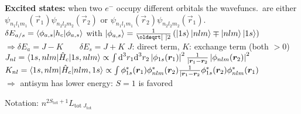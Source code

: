 \begin{squishlist}
    \item \textbf{Excited states:} when two $e^-$ occupy different orbitals the wavefuncs.\ are either
    $\psi_{n_1l_1m_1}(\vec{r}_1) \psi_{n_2l_2m_2}(\vec{r}_2)$ or $\psi_{n_1l_1m_1}(\vec{r}_2) \psi_{n_2l_2m_2}(\vec{r}_1)$. \\
    $\delta E_{a/s} = \braket{\phi_{a,s}|h_c|\phi_{a,s}}$ with
    $\ket{\phi_{a,s}} = \frac{1}{\sqrt{2}} \left( \ket{1s}\ket{nlm} \mp \ket{n l m}\ket{1s}\right)$ \\
    $\Rightarrow \delta E_a = J - K \qquad \delta E_s = J + K$ \qquad $J$: direct term, $K$: exchange term (both $> 0$) \\
    $J_{nl} = \braket{1s,nlm|\hat{H}_c|1s, nlm} \propto \int \textrm{d}^3 r_1 \textrm{d}^3 r_2 \left|\phi_{1s}(\bm{r}_1)\right|^2 \frac{1}{|\bm{r}_1 - \bm{r}_2} \left|\phi_{nlm}(\bm{r}_2)\right|^2$ \\
    $K_{nl} = \braket{1s,nlm|\hat{H}_c|nlm,1s} \propto \int \phi_{1s}^*(\bm{r}_1) \phi_{nlm}^*(\bm{r}_2) \frac{1}{|\bm{r}_1 - \bm{r}_2}\phi_{1s}^*(\bm{r}_2) \phi_{nlm}^*(\bm{r}_1) $ \\
    $\Longrightarrow$ antisym has lower energy: $S=1$ is favored

    \item Notation: $n^{2S_{\text{tot}}+1} L_{\text{tot}\; J_{\text{tot}}}$
\end{squishlist}

